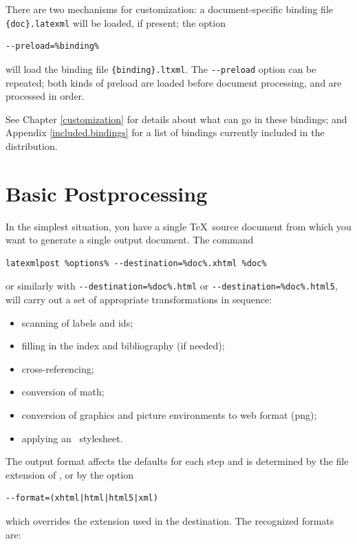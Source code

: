 \documentclass{book}
\newcommand{\shellcode}{\lstinline[style=shell]}
\begin{document}
There are two mechanisms for customization:
a document-specific binding file \shellcode|{doc}.latexml| will
be loaded, if present;
the option
\begin{lstlisting}[style=shell]
--preload=%binding%
\end{lstlisting}
will load the binding file \shellcode|{binding}.ltxml|.
The \shellcode|--preload| option can be repeated;
both kinds of preload are loaded before document processing,
and are processed in order.

See Chapter \ref{customization} for details about what can go in these bindings;
and Appendix \ref{included.bindings} for a list of bindings currently
included in the distribution.


\section[Postprocessing]{Basic Postprocessing}\label{usage.single}
In the simplest situation, you have a single \TeX\ source document
from which you want to generate a single output document.
The command
\begin{lstlisting}[style=shell]
latexmlpost %options% --destination=%doc%.xhtml %doc%
\end{lstlisting}
or similarly with
\shellcode|--destination=%
\shellcode|--destination=%
will carry out a set of appropriate transformations in sequence:
\begin{itemize}
  \item scanning of labels and ids;
  \item filling in the index and bibliography (if needed);
  \item cross-referencing;
  \item conversion of math;
  \item conversion of graphics and picture environments to web format (png);
  \item applying an \XSLT\ stylesheet.
\end{itemize}
The output format affects the defaults for each step and is determined
by the file extension of , or by the option
\begin{lstlisting}[style=shell]
--format=(xhtml|html|html5|xml)
\end{lstlisting}
which overrides the extension used in the destination. The recognized formats are:
\end{document}
